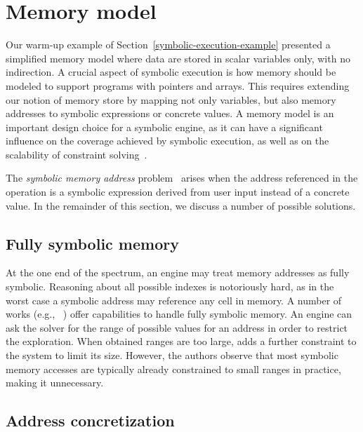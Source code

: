 
\section{Memory model}
\label{memory-model}

Our warm-up example of Section~\ref{symbolic-execution-example} presented a simplified memory model where data are stored in scalar variables only, with no indirection. A crucial aspect of symbolic execution is how memory should be modeled to support programs with pointers and arrays. This requires extending our notion of memory store by mapping not only variables, but also memory addresses to symbolic expressions or concrete values. A memory model is an important design choice for a symbolic engine, as it can have a significant influence on the coverage achieved by symbolic execution, as well as on the scalability of constraint solving~\cite{CS-CACM13}.

The {\em symbolic memory address} problem~\cite{SAB-SP10} arises when the address referenced in the operation is a symbolic expression derived from user input instead of a concrete value. In the remainder of this section, we discuss a number of possible solutions.

\subsection{Fully symbolic memory}
\label{ss:fully-symbolic-memory}

At the one end of the spectrum, an engine may treat memory addresses as fully symbolic. Reasoning about all possible indexes is notoriously hard, as in the worst case a symbolic address may reference any cell in memory. A number of works (e.g., ~\cite{BITBLAZE-ICISS08,TLL-CAV10,BAP-CAV11,TS-ATVA14}) offer capabilities to handle fully symbolic memory.  An engine can ask the solver for the range of possible values for an address in order to restrict the exploration.  When obtained ranges are too large, \cite{BITBLAZE-ICISS08} adds a further constraint to the system to limit its size. However, the authors observe that most symbolic memory accesses are typically already constrained to small ranges in practice, making it unnecessary.

\subsection{Address concretization}
\label{ss:address-concretization}

